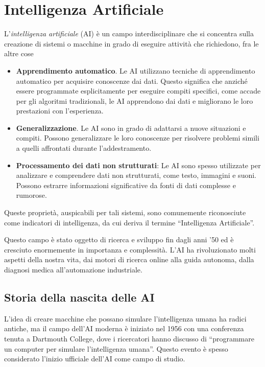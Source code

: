 \documentclass[12pt,a4paper,twoside,openright]{book}
\begin{document}
\section{Intelligenza Artificiale}
L'\emph{intelligenza artificiale} (AI) è un campo interdisciplinare che si concentra sulla creazione di sistemi o macchine in grado di eseguire attività che richiedono, fra le altre cose

\begin{itemize}
    \item \textbf{Apprendimento automatico}. Le AI utilizzano tecniche di apprendimento automatico per acquisire conoscenze dai dati. Questo significa che anziché essere programmate esplicitamente per eseguire compiti specifici, come accade per gli algoritmi tradizionali, le AI apprendono dai dati e migliorano le loro prestazioni con l'esperienza. 
    \item \textbf{Generalizzazione}. Le AI sono in grado di adattarsi a nuove situazioni e compiti. Possono generalizzare le loro conoscenze per risolvere problemi simili a quelli affrontati durante l'addestramento. 
    \item \textbf{Processamento dei dati non strutturati}: Le AI sono spesso utilizzate per analizzare e comprendere dati non strutturati, come testo, immagini e suoni. Possono estrarre informazioni significative da fonti di dati complesse e rumorose.
\end{itemize}

Queste proprietà, auspicabili per tali sistemi, sono comunemente riconosciute come indicatori di intelligenza, da cui deriva il termine ``Intelligenza Artificiale''.

Questo campo è stato oggetto di ricerca e sviluppo fin dagli anni '50 ed è cresciuto enormemente in importanza e complessità. L'AI ha rivoluzionato molti aspetti della nostra vita, dai motori di ricerca online alla guida autonoma, dalla diagnosi medica all'automazione industriale. 

\subsection{Storia della nascita delle AI}
L'idea di creare macchine che possano simulare l'intelligenza umana ha radici antiche, ma il campo dell'AI moderna è iniziato nel 1956 con una conferenza tenuta a Dartmouth College, dove i ricercatori hanno discusso di ``programmare un computer per simulare l'intelligenza umana''. Questo evento è spesso considerato l'inizio ufficiale dell'AI come campo di studio.
\end{document}
